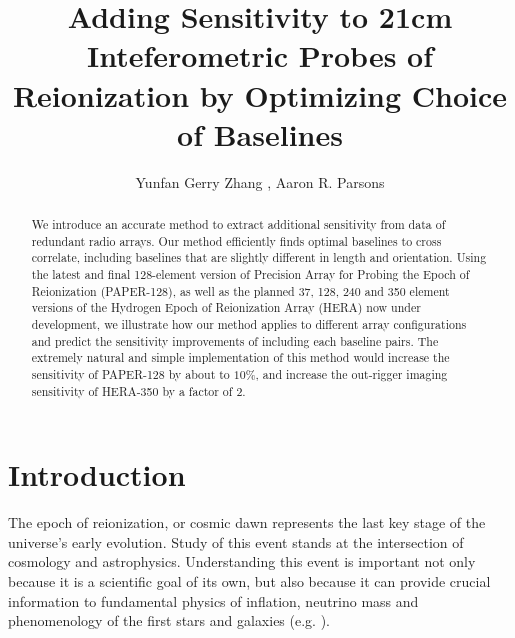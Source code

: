 \documentclass[preprint2,numberedappendix,tighten,twocolappendix]{aastex6}  %
\renewcommand\[{\begin{equation}}
\renewcommand\]{\end{equation}}
\begin{document}
\title{Adding Sensitivity to 21cm Inteferometric Probes of Reionization by Optimizing Choice of Baselines}

\author{
Yunfan Gerry Zhang ,
Aaron R. Parsons
}


\begin{abstract}
We introduce an accurate method to extract additional sensitivity from data of redundant radio arrays. Our method efficiently finds optimal baselines to cross correlate, including baselines that are slightly different in length and orientation. 
Using the latest and final 128-element version of Precision Array for Probing the Epoch of Reionization (PAPER-128), as well as the planned 37, 128, 240 and 350 element versions of the Hydrogen Epoch of Reionization Array (HERA) now under development, we illustrate how our method applies to different array configurations and predict the sensitivity improvements of including each baseline pairs. The extremely natural and simple implementation of this method
would increase the sensitivity of PAPER-128 by about to $10\%$, and increase the out-rigger imaging sensitivity of HERA-350 by a factor of 2. 
\end{abstract}

\section{Introduction}

The epoch of reionization, or cosmic dawn represents the last key
stage of the universe's early evolution. Study of this event stands at
the intersection of cosmology and astrophysics. Understanding this
event is important not only because it is a scientific goal
of its own, but also because it can provide crucial information
to fundamental physics of inflation, neutrino mass and phenomenology
of the first stars and galaxies (e.g. \cite{LiuOpticalDepth}). 
\end{document}
